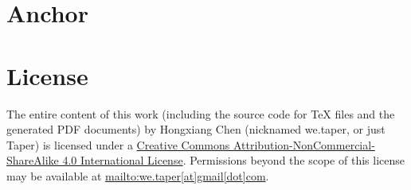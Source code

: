 \documentclass{article}
\numberwithin{equation}{subsection} %
\theoremstyle{definition}
\begin{document}
\section{Anchor}
\label{sec:Anchor}

\begin{thebibliography}{1}
\end{thebibliography}
\printnomenclature
\section{License}
The entire content of this work (including the source code
for TeX files and the generated PDF documents) by 
Hongxiang Chen (nicknamed we.taper, or just Taper) is
licensed under a 
\href{http://creativecommons.org/licenses/by-nc-sa/4.0/}{Creative 
Commons Attribution-NonCommercial-ShareAlike 4.0 International 
License}. Permissions beyond the scope of this 
license may be available at \url{mailto:we.taper[at]gmail[dot]com}.
\end{document}
